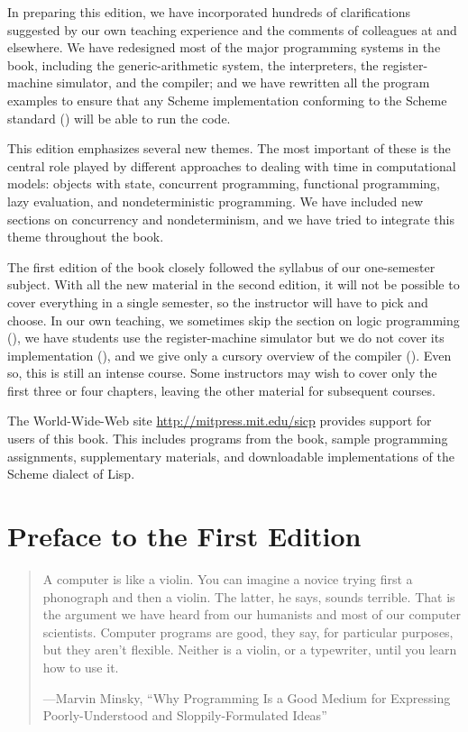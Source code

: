 In preparing this edition, we have incorporated hundreds of clarifications suggested by our own teaching experience and the comments of colleagues at  and elsewhere.
We have redesigned most of the major programming systems in the book, including the generic-arithmetic system, the interpreters, the register-machine simulator, and the compiler;
and we have rewritten all the program examples to ensure that any Scheme implementation conforming to the  Scheme standard () will be able to run the code.

This edition emphasizes several new themes.
The most important of these is the central role played by different approaches to dealing with time in computational models:
objects with state, concurrent programming, functional programming, lazy evaluation, and nondeterministic programming.
We have included new sections on concurrency and nondeterminism, and we have tried to
integrate this theme throughout the book.

The first edition of the book closely followed the syllabus of our
 one-semester subject.
With all the new material in the second edition, it will not be possible to cover everything in a single semester, so the instructor will have to pick and choose.
In our own teaching, we sometimes skip the section on logic programming (), we have students use the register-machine simulator but we do not cover its implementation (), and we give only a cursory overview of the compiler ().
Even so, this is still an intense course.
Some instructors may wish to cover only the first three or four chapters, leaving the other material for subsequent courses.

The World-Wide-Web site \href{http://mitpress.mit.edu/sicp}{http://mitpress.mit.edu/sicp} provides support for users of this book.
This includes programs from the book, sample programming assignments, supplementary materials, and downloadable implementations of the Scheme dialect of Lisp.

\chapter*{Preface to the First Edition}
\label{Preface 1e}

\begin{quote}
A computer is like a violin.
You can imagine a novice trying first a phonograph and then a violin.
The latter, he says, sounds terrible.
That is the argument we have heard from our humanists and most of our computer scientists.
Computer programs are good, they say, for particular purposes, but they aren’t flexible.
Neither is a violin, or a typewriter, until you learn how to use it.

---Marvin Minsky,
“Why Programming Is a Good Medium for Expressing Poorly-Understood and Sloppily-Formulated Ideas”
\end{quote}

